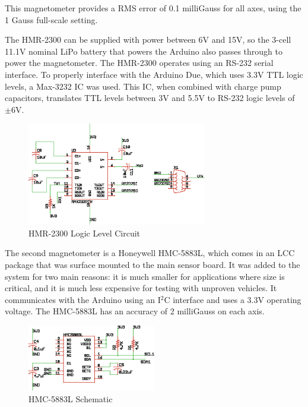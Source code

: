 This magnetometer provides a RMS error of 0.1 milliGauss for all axes, using the 1 Gauss full-scale setting\cite{hmr2300DataSheet}.

The HMR-2300 can be supplied with power between 6V and 15V, so the 3-cell 11.1V nominal LiPo battery that powers the Arduino also passes through to power the magnetometer. The HMR-2300 operates using an RS-232 serial interface. To properly interface with the Arduino Due, which uses 3.3V TTL logic levels, a Max-3232 IC was used. This IC, when combined with charge pump capacitors, translates TTL levels between 3V and 5.5V to RS-232 logic levels of $\pm6$V.
 \begin{figure}[H]
   \centering
     \includegraphics[width=0.7\textwidth]{figures/magBoard.eps}
        \caption{HMR-2300 Logic Level Circuit} \label{magBoardSchematic}
 \end{figure}
 
 The second magnetometer is a Honeywell HMC-5883L, which comes in an LCC package that was surface mounted to the main sensor board. It was added to the system for two main reasons: it is much smaller for applications where size is critical, and it is much less expensive for testing with unproven vehicles. It communicates with the Arduino using an I$^2$C interface and uses a 3.3V operating voltage\cite{hmc5883LDatasheet}. The HMC-5883L has an accuracy of 2 milliGauss on each axis. 
 
 \begin{figure}[H]
   \centering
     \includegraphics[width=0.5\textwidth]{figures/hmc5883LSchematic.eps}
        \caption{HMC-5883L Schematic} \label{hmc5883LSchematic}
 \end{figure}

